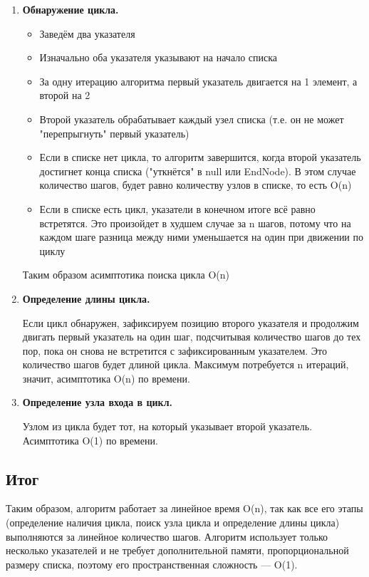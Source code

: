 \documentclass[a4paper,14pt]{article}
\begin{document}
\begin{enumerate}
    \item\textbf{Обнаружение цикла.}
\begin{itemize}
    \item Заведём два указателя
    \item Изначально оба указателя указывают на начало списка
    \item За одну итерацию алгоритма первый указатель двигается на 1 элемент, а второй на 2
    \item Второй указатель обрабатывает каждый узел списка (т.е. он не может "перепрыгнуть" первый указатель)
    \item Если в списке нет цикла, то алгоритм завершится, когда второй указатель достигнет конца списка ("уткнётся" в null или EndNode). В этом случае количество шагов, будет равно количеству узлов в списке, то есть O(n)
    \item Если в списке есть цикл, указатели в конечном итоге всё равно встретятся. Это произойдет в худшем случае за n шагов, потому что на каждом шаге разница между ними уменьшается на один при движении по циклу
\end{itemize}

Таким образом асимптотика поиска цикла O(n)

    \item\textbf{Определение длины цикла.}
    
Если цикл обнаружен, зафиксируем позицию второго указателя и продолжим двигать первый указатель на один шаг, подсчитывая количество шагов до тех пор, пока он снова не встретится с зафиксированным указателем. Это количество шагов будет длиной цикла. Максимум потребуется n итераций, значит, асимптотика O(n) по времени.

    \item\textbf{Определение узла входа в цикл.}

Узлом из цикла будет тот, на который указывает второй указатель. Асимптотика O(1) по времени.
\end{enumerate}

\subsection{Итог}

Таким образом, алгоритм работает за линейное время O(n), так как все его этапы (определение наличия цикла, поиск узла цикла и определение длины цикла) выполняются за линейное количество шагов. Алгоритм использует только несколько указателей и не требует дополнительной памяти, пропорциональной размеру списка, поэтому его пространственная сложность — O(1).
\end{document}
